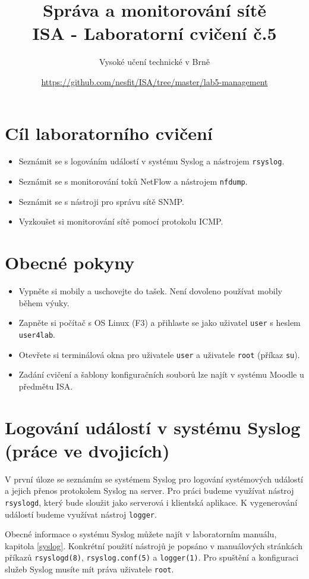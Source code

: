 \documentclass[a4paper,11pt]{article}
\title{Správa a monitorování sítě\\
{\bf\large ISA - Laboratorní cvičení č.5}}
\author{Vysoké učení technické v Brně}
\date{\url{https://github.com/nesfit/ISA/tree/master/lab5-management}}
\begin{document}
{\let\newpage\relax\maketitle} 

\section*{Cíl laboratorního cvičení}
\begin{itemize}
  \item Seznámit se s logováním událostí v systému Syslog a nástrojem {\tt rsyslog}.
  \item Seznámit se s monitorování toků NetFlow a nástrojem {\tt nfdump}.
  \item Seznámit se s nástroji pro správu sítě SNMP.
  \item Vyzkoušet si monitorování sítě pomocí protokolu ICMP.
\end{itemize}

\section*{Obecné pokyny}
\begin{itemize}
  \item Vypněte si mobily a uschovejte do tašek. Není dovoleno používat mobily během výuky. 
  \item Zapněte si počítač s OS Linux (F3) a přihlaste se jako uživatel {\tt user} s heslem {\tt user4lab}.
  \item Otevřete si terminálová okna pro uživatele {\tt user} a uživatele {\tt root} (příkaz {\tt su}).
  \item Zadání cvičení a šablony konfiguračních souborů lze najít v systému Moodle u předmětu ISA.
\end{itemize}

\section{Logování událostí v systému Syslog (práce ve dvojicích)}
V první úloze se seznámím se systémem Syslog pro logování systémových událostí a jejich přenos protokolem Syslog na server.
Pro práci budeme využívat nástroj {\tt rsyslogd}, který bude sloužit jako serverová i klientská aplikace. K vygenerování událostí budeme využívat nástroj {\tt logger}.

Obecné informace o systému Syslog můžete najít v laboratorním manuálu, kapitola \ref{syslog}. Konkrétní použití nástrojů je popsáno v manuálových stránkách příkazů  {\tt rsyslogd(8)}, {\tt rsyslog.conf(5)} a  {\tt logger(1)}. Pro spuštění a konfiguraci služeb Syslog musíte mít práva uživatele {\tt root}.
\end{document}
